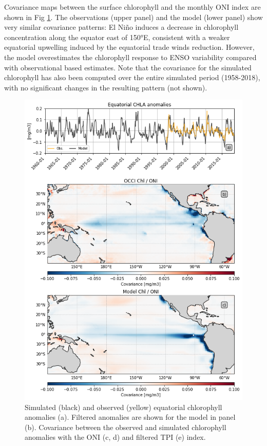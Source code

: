 Covariance maps between the surface chlorophyll and the monthly ONI index are shown in Fig \ref{fig:nemo-sat-chl}. The observations (upper panel) and the model (lower panel) show very similar covariance patterns: El Niño induces a decrease in chlorophyll concentration along the equator east of 150°E, consistent with a weaker equatorial upwelling induced by the equatorial trade winds reduction. However, the model overestimates the chlorophyll response to ENSO variability compared with observational based estimates. Note that the covariance for the simulated chlorophyll has also been computed over the entire simulated period (1958-2018), with no significant changes in the resulting pattern (not shown).

\begin{figure}
	\centering
	\includegraphics[scale=0.4]{figs/fig2.png}
	\caption{Simulated (black) and observed (yellow) equatorial chlorophyll anomalies (a). Filtered anomalies are shown for the model in panel (b). Covariance between the observed and simulated chlorophyll anomalies with the ONI (c, d) and filtered TPI (e) index.}
	\label{fig:nemo-sat-chl}
\end{figure}
